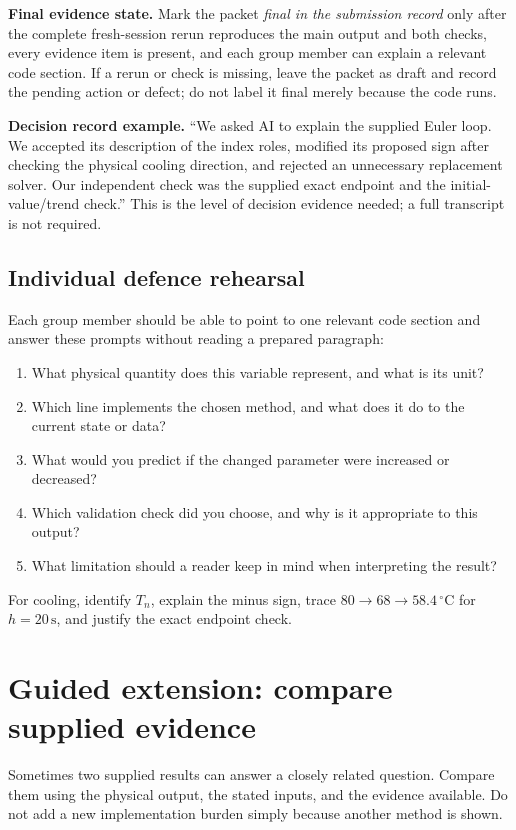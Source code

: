\documentclass[11pt,a4paper]{article}
\newcommand{\units}[1]{\,\mathrm{#1}}
\begin{document}
\begin{keybox}\textbf{Final evidence state.} Mark the packet \emph{final in the submission record} only after the complete fresh-session rerun reproduces the main output and both checks, every evidence item is present, and each group member can explain a relevant code section. If a rerun or check is missing, leave the packet as draft and record the pending action or defect; do not label it final merely because the code runs.\end{keybox}

\begin{aibox}\textbf{Decision record example.} ``We asked AI to explain the supplied Euler loop. We accepted its description of the index roles, modified its proposed sign after checking the physical cooling direction, and rejected an unnecessary replacement solver. Our independent check was the supplied exact endpoint and the initial-value/trend check.'' This is the level of decision evidence needed; a full transcript is not required.\end{aibox}

\subsection*{Individual defence rehearsal}
Each group member should be able to point to one relevant code section and answer these prompts without reading a prepared paragraph:

\begin{enumerate}[nosep,leftmargin=7mm]
\item What physical quantity does this variable represent, and what is its unit?
\item Which line implements the chosen method, and what does it do to the current state or data?
\item What would you predict if the changed parameter were increased or decreased?
\item Which validation check did you choose, and why is it appropriate to this output?
\item What limitation should a reader keep in mind when interpreting the result?
\end{enumerate}

For cooling, identify $T_n$, explain the minus sign, trace $80\rightarrow68\rightarrow58.4\units{^\circ C}$ for $h=20\units{s}$, and justify the exact endpoint check.

\section*{Guided extension: compare supplied evidence}
Sometimes two supplied results can answer a closely related question. Compare them using the physical output, the stated inputs, and the evidence available. Do not add a new implementation burden simply because another method is shown.
\end{document}
